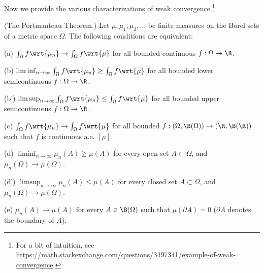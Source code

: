 \documentclass{article} %
\begin{document}
Now we provide the various characterizations of weak convergence.\footnote{For a bit of intuition, see \url{https://math.stackexchange.com/questions/3497341/example-of-weak-convergence}.}

\begin{theorem}{\textnormal{(The Portmanteau Theorem.)}}
Let $\mu, \mu_1, \mu_2, \hdots$ be finite measures on the Borel sets of a metric space $\Omega$. The following conditions are equivalent:
\begin{alphabate}
\item[(a)] $\int_\Omega f \wrt{\mu_n} \to \int_\Omega f \wrt{\mu} $ for all bounded continuous $f: \Omega \to \R$.
\item[(b)] $\liminf_{n \to \infty} \int_\Omega f \wrt{\mu_n} \geq \int_\Omega f \wrt{\mu} $ for all bounded lower semicontinuous $f: \Omega \to \R$.
\item[(b')] $\limsup_{n \to \infty} \int_\Omega f \wrt{\mu_n} \leq \int_\Omega f \wrt{\mu} $ for all bounded upper semicontinuous $f: \Omega \to \R$.
\item[(c)]  $\int_\Omega f \wrt{\mu_n} \to \int_\Omega f \wrt{\mu} $ for all bounded $f: (\Omega, \B(\Omega)) \to (\R, \B(\R))$ such that $f$ is continuous a.e. $[\mu]$.
\item[(d)] $\liminf_{n \to \infty} \mu_n(A) \geq \mu(A)$ for every open set $A \subset \Omega$, and $\mu_n(\Omega) \to \mu(\Omega).$
\item[(d')] $\limsup_{n \to \infty} \mu_n(A) \leq \mu(A)$ for every closed set $A \subset \Omega$, and $\mu_n(\Omega) \to \mu(\Omega).$
\item[(e)] $\mu_n(A) \to \mu(A)$ for every $A \in \B(\Omega)$ such that $\mu(\partial A) =0$ ($\partial A$ denotes the boundary of $A$).
\end{alphabate}
\label{thm:weak_convergence}	
\end{theorem}
\end{document}
